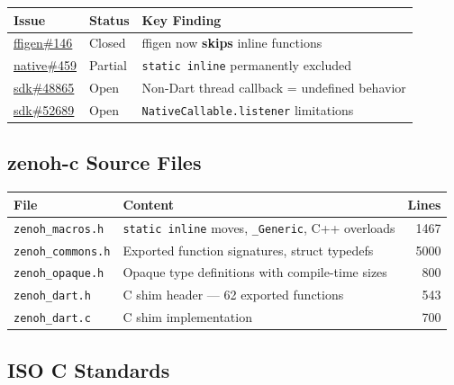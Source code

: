 \documentclass[11pt,a4paper]{article}
\newcommand{\code}[1]{\texttt{#1}}
\newcommand{\file}[1]{\texttt{#1}}
\begin{document}
\begin{table}[ht]
\centering\small
\begin{tabularx}{\textwidth}{llL}
  \toprule
  \textbf{Issue} & \textbf{Status} & \textbf{Key Finding} \\
  \midrule
  \href{https://github.com/dart-lang/ffigen/issues/146}{ffigen\#146}
    & Closed & ffigen now \textbf{skips} inline functions \\
  \href{https://github.com/dart-lang/native/issues/459}{native\#459}
    & Partial & \code{static inline} permanently excluded \\
  \href{https://github.com/dart-lang/sdk/issues/48865}{sdk\#48865}
    & Open & Non-Dart thread callback = undefined behavior \\
  \href{https://github.com/dart-lang/sdk/issues/52689}{sdk\#52689}
    & Open & \code{NativeCallable.listener} limitations \\
  \bottomrule
\end{tabularx}
\end{table}

\subsection{zenoh-c Source Files}

\begin{table}[ht]
\centering\small
\begin{tabularx}{\textwidth}{lLr}
  \toprule
  \textbf{File} & \textbf{Content} & \textbf{Lines} \\
  \midrule
  \file{zenoh\_macros.h}   & \code{static inline} moves, \code{\_Generic}, C++ overloads & 1467 \\
  \file{zenoh\_commons.h}  & Exported function signatures, struct typedefs & \raisebox{0.5ex}{\texttildelow}5000 \\
  \file{zenoh\_opaque.h}   & Opaque type definitions with compile-time sizes & \raisebox{0.5ex}{\texttildelow}800 \\
  \file{zenoh\_dart.h}     & C shim header --- 62 exported functions & 543 \\
  \file{zenoh\_dart.c}     & C shim implementation & \raisebox{0.5ex}{\texttildelow}700 \\
  \bottomrule
\end{tabularx}
\end{table}

\subsection{ISO C Standards}
\end{document}
